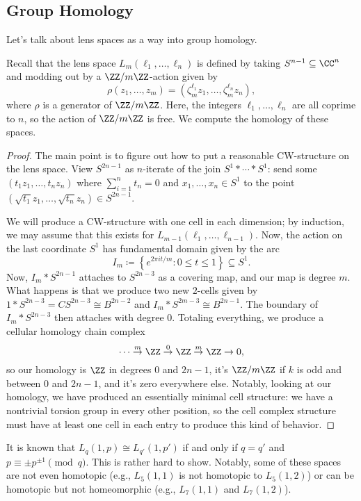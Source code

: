 \documentclass[../notes.tex]{subfiles}
\begin{document}
\subsection{Group Homology}
Let's talk about lens spaces as a way into group homology.
\begin{example} \label{ex:lens-homology}
	Recall that the lens space $L_m(\ell_1,\ldots,\ell_n)$ is defined by taking $S^{n-1}\subseteq\CC^n$ and modding out by a $\ZZ/m\ZZ$-action given by
	\[\rho(z_1,\ldots,z_m)=\left(\zeta_m^{\ell_1}z_1,\ldots,\zeta_m^{\ell_n}z_n\right),\]
	where $\rho$ is a generator of $\ZZ/m\ZZ$. Here, the integers $\ell_1,\ldots,\ell_n$ are all coprime to $n$, so the action of $\ZZ/m\ZZ$ is free. We compute the homology of these spaces.
\end{example}
\begin{proof}
	The main point is to figure out how to put a reasonable CW-structure on the lens space. View $S^{2n-1}$ as $n$-iterate of the join $S^1*\cdots*S^1$: send some $(t_1z_1,\ldots,t_nz_n)$ where $\sum_{i=1}^nt_n=0$ and $x_1,\ldots,x_n\in S^1$ to the point $(\sqrt{t_1}z_1,\ldots,\sqrt{t_n}z_n)\in S^{2n-1}$.
	
	We will produce a CW-structure with one cell in each dimension; by induction, we may assume that this exists for $L_{m-1}(\ell_1,\ldots,\ell_{n-1})$. Now, the action on the last coordinate $S^1$ has fundamental domain given by the arc
	\[I_m\coloneqq\left\{e^{2\pi it/m}:0\le t\le1\right\}\subseteq S^1.\]
	Now, $I_m*S^{2n-1}$ attaches to $S^{2n-3}$ as a covering map, and our map is degree $m$. What happens is that we produce two new $2$-cells given by $1*S^{2n-3}=CS^{2n-3}\cong B^{2n-2}$ and $I_m*S^{2m-3}\cong B^{2n-1}$. The boundary of $I_m*S^{2n-3}$ then attaches with degree $0$. Totaling everything, we produce a cellular homology chain complex
	\[\cdots\stackrel m\to\ZZ\stackrel0\to\ZZ\stackrel m\to\ZZ\to0,\]
	so our homology is $\ZZ$ in degrees $0$ and $2n-1$, it's $\ZZ/m\ZZ$ if $k$ is odd and between $0$ and $2n-1$, and it's zero everywhere else. Notably, looking at our homology, we have produced an essentially minimal cell structure: we have a nontrivial torsion group in every other position, so the cell complex structure must have at least one cell in each entry to produce this kind of behavior.
\end{proof}
\begin{remark}
	It is known that $L_q(1,p)\cong L_{q'}(1,p')$ if and only if $q=q'$ and $p\equiv \pm p^{\pm1}\pmod q$. This is rather hard to show. Notably, some of these spaces are not even homotopic (e.g., $L_5(1,1)$ is not homotopic to $L_5(1,2)$) or can be homotopic but not homeomorphic (e.g., $L_7(1,1)$ and $L_7(1,2)$).
\end{remark}
\end{document}
